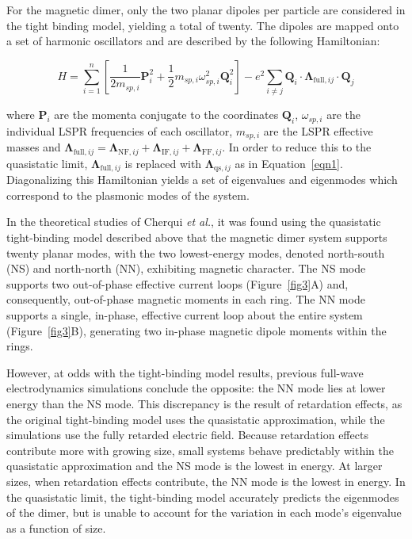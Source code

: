 \documentclass[journal=jpccck,manuscript=article]{achemso}
\begin{document}
For the magnetic dimer, only the two planar dipoles per particle are considered in the tight binding model, yielding a total of twenty. The dipoles are mapped onto a set of harmonic oscillators and are described by the following Hamiltonian:

\begin{equation}
  H = \sum_{i=1}^{n}\left[\frac{1}{2m_{sp,i}}\textbf{P}_{i}^{2}+\frac{1}{2}m_{sp,i}\omega_{sp,i}^{2}\textbf{Q}_{i}^{2}\right]-e^2\sum_{i\neq j}\textbf{Q}_{i}\cdot\boldsymbol{\Lambda}_{\textrm{full},ij}\cdot\textbf{Q}_{j} \label{eqn4}
\end{equation}

where $\textbf{P}_i$ are the momenta conjugate to the coordinates $\textbf{Q}_{i}$, $\omega_{sp,i}$ are the individual LSPR frequencies of each oscillator, $m_{sp,i}$ are the LSPR effective masses and $\boldsymbol{\Lambda}_{\textrm{full},ij}=\boldsymbol{\Lambda}_{\textrm{NF},ij}+\boldsymbol{\Lambda}_{\textrm{IF},ij}+\boldsymbol{\Lambda}_{\textrm{FF},ij}$. In order to reduce this to the quasistatic limit, $\boldsymbol{\Lambda}_{\textrm{full},ij}$ is replaced with $\boldsymbol{\Lambda}_{\textrm{qs},ij}$ as in Equation~\ref{eqn1}. Diagonalizing this Hamiltonian yields a set of eigenvalues and eigenmodes which correspond to the plasmonic modes of the system.

In the theoretical studies of Cherqui \textit{et al.}\cite{Cherqui2014}, it was found using the quasistatic tight-binding model described above that the magnetic dimer system supports twenty planar modes, with the two lowest-energy modes, denoted north-south (NS) and north-north (NN), exhibiting magnetic character. The NS mode supports two out-of-phase effective current loops (Figure~\ref{fig3}A) and, consequently, out-of-phase magnetic moments in each ring. The NN mode supports a single, in-phase, effective current loop about the entire system (Figure~\ref{fig3}B), generating two in-phase magnetic dipole moments within the rings.

However, at odds with the tight-binding model results, previous full-wave electrodynamics simulations conclude the opposite: the NN mode lies at lower energy than the NS mode. This discrepancy is the result of retardation effects, as the original tight-binding model uses the quasistatic approximation, while the simulations use the fully retarded electric field. Because retardation effects contribute more with growing size, small systems behave predictably within the quasistatic approximation and the NS mode is the lowest in energy. At larger sizes, when retardation effects contribute, the NN mode is the lowest in energy. In the quasistatic limit, the tight-binding model accurately predicts the eigenmodes of the dimer, but is unable to account for the variation in each mode's eigenvalue as a function of size.
\end{document}
